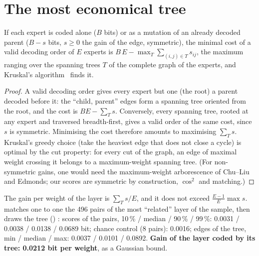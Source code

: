 \section{The most economical tree}\label{t3dup:sec:arbre}

\begin{proposition}\label{t3dup:prop:arbre}
If each expert is coded alone ($B$ bits) or as a mutation of an already decoded parent ($B - s$ bits, $s \ge 0$ the gain of the edge, symmetric), the minimal cost of a valid decoding order of $E$ experts is $B\,E - \max_T \sum_{(i,j) \in T} s_{ij}$, the maximum ranging over the spanning trees $T$ of the complete graph of the experts, and Kruskal's algorithm~\cite{kruskal1956} finds it.
\end{proposition}

\begin{proof}
A valid decoding order gives every expert but one (the root) a parent decoded before it: the ``child, parent'' edges form a spanning tree oriented from the root, and the cost is $BE - \sum_T s$. Conversely, every spanning tree, rooted at any expert and traversed breadth-first, gives a valid order of the same cost, since $s$ is symmetric. Minimising the cost therefore amounts to maximising $\sum_T s$. Kruskal's greedy choice (take the heaviest edge that does not close a cycle) is optimal by the cut property: for every cut of the graph, an edge of maximal weight crossing it belongs to a maximum-weight spanning tree. (For non-symmetric gains, one would need the maximum-weight arborescence of Chu--Liu and Edmonds; our scores are symmetric by construction, $\cos^2$ and matching.)
\end{proof}

The gain per weight of the layer is $\sum_T s / E$, and it does not exceed $\frac{E-1}{E}\max s$.  matches one to one the 496 pairs of the most ``related'' layer of the sample, then draws the tree () \mes: scores of the pairs, 10\,\% / median / 90\,\% / 99\,\%: 0.0031 / 0.0038 / 0.0138 / 0.0689 bit; chance control (8 pairs): 0.0016; edges of the tree, min / median / max: 0.0037 / 0.0101 / 0.0892. \textbf{Gain of the layer coded by its tree: 0.0212 bit per weight}, as a Gaussian bound.

\begin{figure}[tbp]
\centering
\GrapheDupArbre
{}
\label{fig:t3-dup-arbre}
\end{figure}

